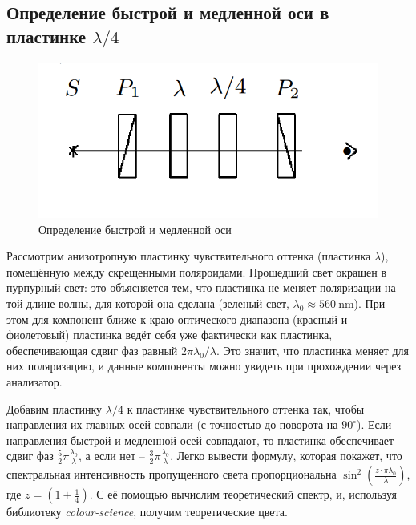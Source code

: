 \documentclass[12pt, a4paper]{article}
\begin{document}
\subsection{Определение быстрой и медленной оси в пластинке $\lambda/4$}
\begin{figure}
    \vspace{-8mm}
    \includegraphics[width=\linewidth]{pics/lambda_4.png}
    \caption{Определение быстрой и медленной оси}
    \label{pic:axes}
\end{figure}
Рассмотрим анизотропную пластинку чувствительного оттенка (пластинка $\lambda$),
помещённую между скрещенными поляроидами. Прошедший свет окрашен в пурпурный свет:
это объясняется тем, что пластинка не меняет поляризации на той длине волны, для
которой она сделана (зеленый свет, $\lambda_0\approx 560~\mathrm{nm}$). При этом
для компонент ближе к краю оптического диапазона (красный и фиолетовый) пластинка
ведёт себя уже фактически как пластинка, обеспечивающая сдвиг фаз равный
$2\pi \lambda_0 / \lambda$. Это значит, что пластинка меняет для них поляризацию,
и данные компоненты можно увидеть при прохождении через анализатор.

Добавим пластинку $\lambda/4$ к пластинке чувствительного оттенка так, чтобы
направления их главных осей совпали (с точностью до поворота на $90^\circ$).
Если направления быстрой и медленной осей совпадают, то пластинка обеспечивает
сдвиг фаз $\frac{5}{2}\pi \frac{\lambda_0}{\lambda}$, а если нет --
$\frac{3}{2}\pi \frac{\lambda_0}{\lambda}$. Легко вывести формулу, которая
покажет, что спектральная интенсивность пропущенного света пропорциональна
$\sin^2 \left(\frac{z \cdot \pi \lambda_0}{\lambda}\right)$, где $z=(1\pm \frac
    1 4)$. С её помощью вычислим теоретический спектр, и, используя библиотеку
\textit{colour-science}, получим теоретические цвета.
\end{document}
